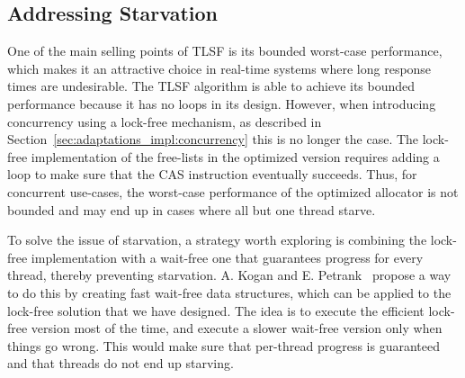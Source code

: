 \subsection{Addressing Starvation}
\label{sec:future-work:starvation}

One of the main selling points of TLSF is its bounded worst-case performance, which makes it an attractive choice in real-time systems where long response times are undesirable. The TLSF algorithm is able to achieve its bounded performance because it has no loops in its design. However, when introducing concurrency using a lock-free mechanism, as described in Section~\ref{sec:adaptations_impl:concurrency} this is no longer the case. The lock-free implementation of the free-lists in the optimized version requires adding a loop to make sure that the CAS instruction eventually succeeds. Thus, for concurrent use-cases, the worst-case performance of the optimized allocator is not bounded and may end up in cases where all but one thread starve. 

To solve the issue of starvation, a strategy worth exploring is combining the lock-free implementation with a wait-free one that guarantees progress for every thread, thereby preventing starvation. A. Kogan and E. Petrank~\cite{fast_wait_free} propose a way to do this by creating fast wait-free data structures, which can be applied to the lock-free solution that we have designed. The idea is to execute the efficient lock-free version most of the time, and execute a slower wait-free version only when things go wrong. This would make sure that per-thread progress is guaranteed and that threads do not end up starving.


